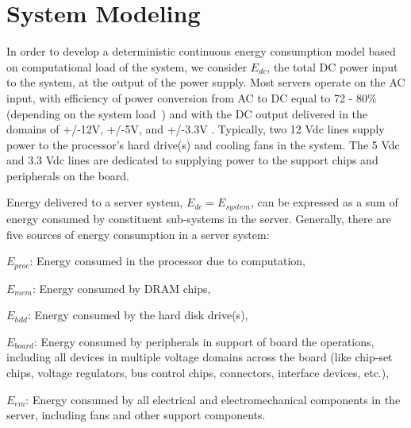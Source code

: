 %
%
\chapter{System Modeling}
\label{chp:modelstruct}
In order to develop a deterministic continuous energy consumption model
based on computational load of the system, we consider $E_{dc}$, the
total DC power input to the system, at the output of the power supply.
Most servers operate on the AC input, with efficiency of power
conversion from AC to DC equal to 72 - 80\% (depending on the system
load~\cite{ton2008}) and with the DC output delivered in the domains of
+/-12V, +/-5V, and +/-3.3V \cite{SSI2004}.  Typically, two 12 Vdc lines
supply power to the processor's hard drive(s) and cooling fans in the
system.  The 5 Vdc and 3.3 Vdc lines are dedicated to supplying power to
the support chips and peripherals on the board.

Energy delivered to a server system, $E_{dc} = E_{system}$, can be
expressed as a sum of energy consumed by constituent sub-systems in the
server.  Generally, there are five sources of energy consumption in a
server system:
\begin{description}
\item{$E_{proc}$:} Energy consumed in the processor due to computation,
\item{$E_{mem}$:} Energy consumed by DRAM chips,
\item{$E_{hdd}$:} Energy consumed by the hard disk drive(s),
\item{$E_{board}$:} Energy consumed by peripherals in support of board the
  operations, including all devices in multiple voltage domains across the board
  (like chip-set chips, voltage regulators, bus control chips, connectors, interface devices, etc.),
\item{$E_{em}$:} Energy consumed by all electrical and electromechanical
  components in the server, including fans and other support components.
\end{description}

